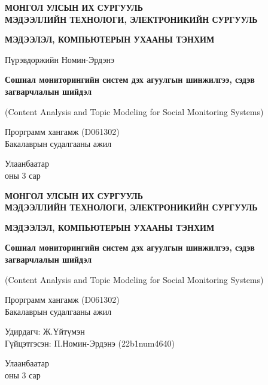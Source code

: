 \documentclass[12pt,a4paper]{report}
\begin{document}
\begin{titlepage}
    \thispagestyle{empty}
    \centering
    {\large\bfseries МОНГОЛ УЛСЫН ИХ СУРГУУЛЬ \\ МЭДЭЭЛЛИЙН ТЕХНОЛОГИ, ЭЛЕКТРОНИКИЙН СУРГУУЛЬ\par}
    {\large\bfseries МЭДЭЭЛЭЛ, КОМПЬЮТЕРЫН УХААНЫ ТЭНХИМ\par}
    \vspace{4cm}
    {\Large Пүрэвдоржийн Номин-Эрдэнэ\par}
    \vspace{2.5cm}
    {\Huge\bfseries Сошиал мониторингийн систем дэх агуулгын шинжилгээ, сэдэв загварчлалын шийдэл\par}
    \vspace{0.5cm}
    {\Large (Content Analysis and Topic Modeling for Social Monitoring Systems)\par}
    \vspace{1.5cm}
    {\large Прорграмм хангамж (D061302)\\
    Бакалаврын судалгааны ажил\par}
    \vfill
    Улаанбаатар \\ \the\year{} оны 3 сар
    
    \newpage
    \centering
    {\large\bfseries МОНГОЛ УЛСЫН ИХ СУРГУУЛЬ \\ МЭДЭЭЛЛИЙН ТЕХНОЛОГИ, ЭЛЕКТРОНИКИЙН СУРГУУЛЬ\par}
    {\large\bfseries МЭДЭЭЛЭЛ, КОМПЬЮТЕРЫН УХААНЫ ТЭНХИМ\par}
    \vspace{6cm}
    {\Huge\bfseries Сошиал мониторингийн систем дэх агуулгын шинжилгээ, сэдэв загварчлалын шийдэл\par}
    \vspace{0.5cm}
    {\Large (Content Analysis and Topic Modeling for Social Monitoring Systems)\par}
    \vspace{1.5cm}
    {\large Прорграмм хангамж (D061302)\\
    Бакалаврын судалгааны ажил\par}
    \vspace{2.5cm}
    
    \begin{flushleft}
        \hspace{3cm} Удирдагч: \hspace{3cm} Ж.Үйтүмэн\\
        \vspace{0.5cm}
        \hspace{3cm} Гүйцэтгэсэн: \hspace{2.5cm} П.Номин-Эрдэнэ (22b1num4640)
    \end{flushleft}

    \vfill
    Улаанбаатар \\ \the\year{} оны 3 сар
\end{titlepage}
\end{document}
